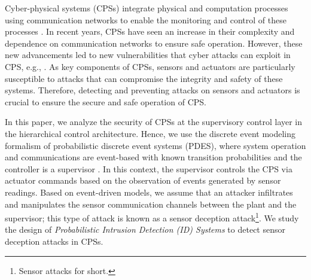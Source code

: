 Cyber-physical systems (CPSs) integrate physical and computation processes using communication networks to enable the monitoring and control of these processes \citep{allgower2019}. 
In recent years, CPSs have seen an increase in their complexity and dependence on communication networks to ensure safe operation.
However, these new advancements led to new vulnerabilities that cyber attacks can exploit in CPS, e.g., \citep{Farwell:2011,Checkoway:2011,Greenberg:2020,Easterly:2023}.
As key components of CPSs,  sensors and actuators are particularly susceptible to attacks that can compromise the integrity and safety of these systems. 
Therefore, detecting and preventing attacks on sensors and actuators is crucial to ensure the secure and safe operation of CPS.




In this paper, we analyze the security of CPSs at the supervisory control layer in the hierarchical control architecture.
Hence, we use the discrete event modeling formalism of probabilistic discrete event systems (PDES), where system operation and communications are event-based with known transition probabilities and the controller is a supervisor \citep{Lawford:1993,Garg:1999,Lafortune:2021}. 
In this context, the supervisor controls the CPS via actuator commands based on the observation of events generated by sensor readings. 
Based on event-driven models, we assume that an attacker infiltrates and manipulates the sensor communication channels between the plant and the supervisor; this type of attack is known as a sensor deception attack\footnote{Sensor attacks for short.}.
We study the design of \emph{Probabilistic Intrusion Detection (ID) Systems} to detect sensor deception attacks in CPSs. 

